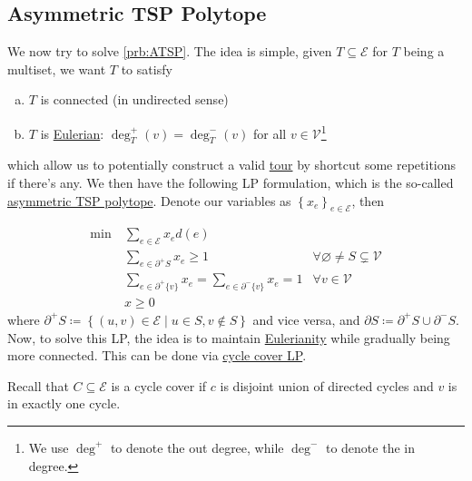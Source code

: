 \subsection{Asymmetric TSP Polytope}
We now try to solve \autoref{prb:ATSP}. The idea is simple, given \(T\subseteq \mathcal{E} \) for \(T\) being a multiset, we want \(T\) to satisfy
\begin{enumerate}[(a)]
	\item \(T\) is connected (in undirected sense)
	\item \(T\) is \href{https://en.wikipedia.org/wiki/Eulerian_path}{Eulerian}: \(\deg_T^+(v) = \deg_T^-(v)\) for all \(v\in \mathcal{V} \)\footnote{We use \(\deg^+\) to denote the out degree, while \(\deg^-\) to denote the in degree.}
\end{enumerate}
which allow us to potentially construct a valid \hyperref[def:tour]{tour} by shortcut some repetitions if there's any. We then have the following LP formulation, which is the so-called \hyperref[eq:ATSP-polytope]{asymmetric TSP polytope}. Denote our variables as \(\left\{ x_e \right\} _{e\in \mathcal{E} }\), then

\begin{equation}\label{eq:ATSP-polytope}
	\begin{aligned}
		\min~ & \sum_{e\in \mathcal{E} } x_e d(e)                                                                                             \\
		      & \sum_{e\in \partial ^+ S} x_e \geq 1                                      & \forall \varnothing \neq S \subsetneq \mathcal{V} \\
		      & \sum_{e\in \partial ^+ \{v\}} x_e = \sum_{e\in \partial ^- \{v\}} x_e = 1 & \forall v\in \mathcal{V}                          \\
		      & x \geq 0
	\end{aligned}
\end{equation}
where \(\partial ^+ S\coloneqq \left\{ (u, v)\in \mathcal{E} \mid u\in S, v \notin S \right\} \) and vice versa, and \(\partial S\coloneqq \partial ^+S \cup \partial ^-S\). Now, to solve this LP, the idea is to maintain \href{https://en.wikipedia.org/wiki/Eulerian_path}{Eulerianity} while gradually being more connected. This can be done via \hyperref[subsec:cycle-covering-LP]{cycle cover LP}.

\begin{prev}
	Recall that \(C \subseteq \mathcal{E} \) is a cycle cover if \(c\) is disjoint union of directed cycles and \(v\) is in exactly one cycle.
\end{prev}

